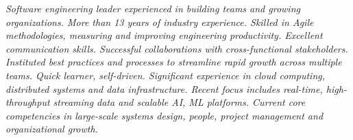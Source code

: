 {\selectfont
	\begin{justify}\textit{Software engineering leader experienced in building teams and growing organizations. More than 13 years of industry experience. Skilled in Agile methodologies, measuring and improving engineering productivity. Excellent communication skills. Successful collaborations with cross-functional stakeholders. Instituted best practices and processes to streamline rapid growth across multiple teams. Quick learner, self-driven. Significant experience in cloud computing, distributed systems and data infrastructure. Recent focus includes real-time, high-throughput streaming data and scalable AI, ML platforms. Current core competencies in large-scale systems design, people, project management and organizational growth.}\end{justify}
}
\vspace{-12pt}
